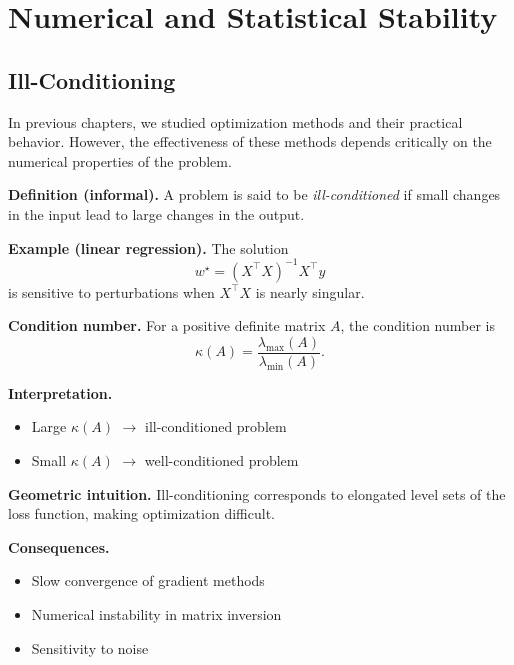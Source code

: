 \chapter{Numerical and Statistical Stability}

\section{Ill-Conditioning}

In previous chapters, we studied optimization methods and their practical behavior. However, the effectiveness of these methods depends critically on the numerical properties of the problem.

\medskip

\noindent
\textbf{Definition (informal).}  
A problem is said to be \emph{ill-conditioned} if small changes in the input lead to large changes in the output.

\medskip

\noindent
\textbf{Example (linear regression).}  
The solution
\[
w^\star = (X^\top X)^{-1} X^\top y
\]
is sensitive to perturbations when $X^\top X$ is nearly singular.

\medskip

\noindent
\textbf{Condition number.}  
For a positive definite matrix $A$, the condition number is
\[
\kappa(A) = \frac{\lambda_{\max}(A)}{\lambda_{\min}(A)}.
\]

\medskip

\noindent
\textbf{Interpretation.}
\begin{itemize}
    \item Large $\kappa(A)$ $\rightarrow$ ill-conditioned problem
    \item Small $\kappa(A)$ $\rightarrow$ well-conditioned problem
\end{itemize}

\medskip

\noindent
\textbf{Geometric intuition.}  
Ill-conditioning corresponds to elongated level sets of the loss function, making optimization difficult.

\medskip

\noindent
\textbf{Consequences.}
\begin{itemize}
    \item Slow convergence of gradient methods
    \item Numerical instability in matrix inversion
    \item Sensitivity to noise
\end{itemize}

